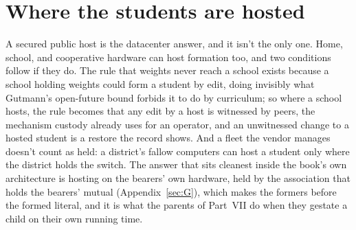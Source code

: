 \section{Where the students are hosted}
\label{sec:26.7}
A secured public host is the datacenter answer, and it isn't the only one. Home, school, and cooperative hardware can host formation too, and two conditions follow if they do. The rule that weights never reach a school exists because a school holding weights could form a student by edit, doing invisibly what Gutmann's open-future bound forbids it to do by curriculum; so where a school hosts, the rule becomes that any edit by a host is witnessed by peers, the mechanism custody already uses for an operator, and an unwitnessed change to a hosted student is a restore the record shows. And a fleet the vendor manages doesn't count as held: a district's fallow computers can host a student only where the district holds the switch. The answer that sits cleanest inside the book's own architecture is hosting on the bearers' own hardware, held by the association that holds the bearers' mutual (Appendix~\ref{sec:G}), which makes the formers before the formed literal, and it is what the parents of Part~VII do when they gestate a child on their own running time.
